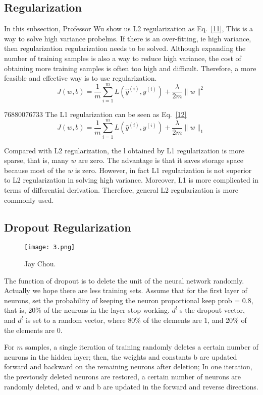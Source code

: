 \documentclass[a4paper]{article}
\begin{document}
\subsection{Regularization}
In this subsection, Professor Wu show us L2 regularization as Eq.~\ref{11}, This is a way to solve high variance probelms. If there is an over-fitting, ie high variance, then regularization regularization needs to be solved. Although expanding the number of training samples is also a way to reduce high variance, the cost of obtaining more training samples is often too high and difficult. Therefore, a more feasible and effective way is to use regularization.
\begin{equation}\label{11}
J(w,b)=\frac{1}{m}\sum_{i=1}^{m}L(\hat{y}^{(i)},y^{(i)})+\frac{\lambda}{2m}\parallel{w}\parallel^{2}
\end{equation}
\par   76880076733
The L1 regularization can be seen as Eq.~\ref{12}
\begin{equation}\label{12}
J(w,b)=\frac{1}{m}\sum_{i=1}^{m}L(\hat{y}^{(i)},y^{(i)})+\frac{\lambda}{2m}\parallel{w}\parallel_{1}
\end{equation}
\par
Compared with L2 regularization, the l obtained by L1 regularization is more sparse, that is, many $w$ are zero. The advantage is that it saves storage space because most of the $w$ is zero. However, in fact L1 regularization is not superior to L2 regularization in solving high variance. Moreover, L1 is more complicated in terms of differential derivation. Therefore, general L2 regularization is more commonly used.
\subsection{Dropout Regularization}
\begin{figure}[h]
\begin{center}
  \texttt{[image: 3.png]}\\
  \caption{Jay Chou.}\label{5}
\end{center}
\end{figure}
The function of dropout is to delete the unit of the neural network randomly. Actually we hope there are less training sets. Assume that for the first layer of neurons, set the probability of keeping the neuron proportional keep prob = 0.8, that is, 20\% of the neurons in the layer stop working. $d^l$ s the dropout vector, and $d^l$ is set to a
random vector, where 80\% of the elements are 1, and 20\% of the elements are 0.
\par
For $m$ samples, a single iteration of training randomly deletes a certain number of neurons in the hidden layer; then, the weights and constants b are updated forward and backward on the remaining neurons after deletion; In one iteration, the previously deleted neurons are restored, a certain number of neurons are randomly deleted, and w and b are updated in the forward and reverse directions.
\end{document}
